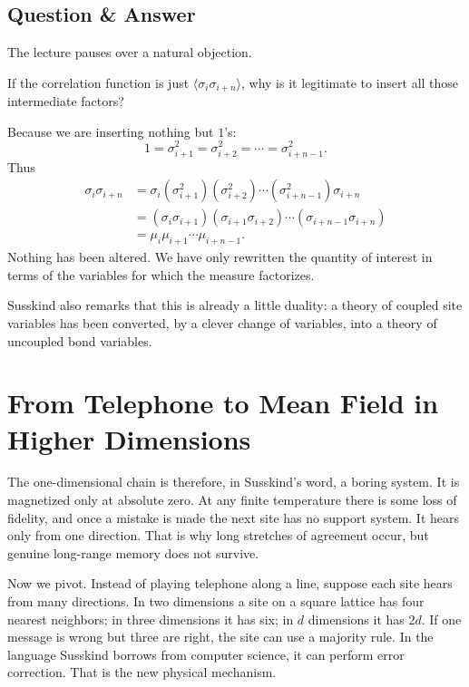 \subsection{Question \& Answer}

The lecture pauses over a natural objection.

If the correlation function is just \(\langle \sigma_i\sigma_{i+n}\rangle\), why is it legitimate to insert all those intermediate factors?

Because we are inserting nothing but \(1\)'s:
\begin{equation}
1=\sigma_{i+1}^2=\sigma_{i+2}^2=\cdots=\sigma_{i+n-1}^2.
\end{equation}
Thus
\begin{align}
\sigma_i\sigma_{i+n}
&=\sigma_i(\sigma_{i+1}^2)(\sigma_{i+2}^2)\cdots(\sigma_{i+n-1}^2)\sigma_{i+n} \\
&=(\sigma_i\sigma_{i+1})(\sigma_{i+1}\sigma_{i+2})\cdots(\sigma_{i+n-1}\sigma_{i+n}) \\
&=\mu_i\mu_{i+1}\cdots\mu_{i+n-1}.
\end{align}
Nothing has been altered. We have only rewritten the quantity of interest in terms of the variables for which the measure factorizes.

Susskind also remarks that this is already a little duality: a theory of coupled site variables has been converted, by a clever change of variables, into a theory of uncoupled bond variables.

\section{From Telephone to Mean Field in Higher Dimensions}

The one-dimensional chain is therefore, in Susskind's word, a boring system. It is magnetized only at absolute zero. At any finite temperature there is some loss of fidelity, and once a mistake is made the next site has no support system. It hears only from one direction. That is why long stretches of agreement occur, but genuine long-range memory does not survive.

Now we pivot. Instead of playing telephone along a line, suppose each site hears from many directions. In two dimensions a site on a square lattice has four nearest neighbors; in three dimensions it has six; in \(d\) dimensions it has \(2d\). If one message is wrong but three are right, the site can use a majority rule. In the language Susskind borrows from computer science, it can perform error correction. That is the new physical mechanism.

